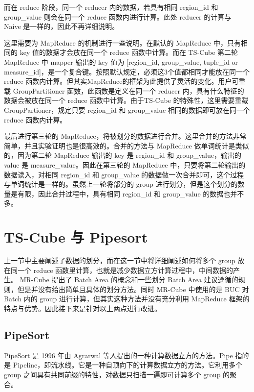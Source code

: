 而在 reduce 阶段，同一个 reducer 内的数据，若具有相同 region\_id 和 group\_value 则会在同一个 reduce 函数内进行计算。此处 reducer 的计算与 Naive 是一样的，因此不再详细说明。


这里需要为 MapReduce 的机制进行一些说明。在默认的 MapReduce 中，只有相同的 key 值的数据才会放在同一个 reduce 函数中计算。而在 TS-Cube 第二轮 MapReduce 中 mapper 输出的 key 值为 [region\_id, group\_value, tuple\_id or measure\_id]，是一个复合键。按照默认规定，必须这3个值都相同才能放在同一个 reduce 函数内计算。但其实MapReduce的框架为此提供了灵活的变化。用户可重载 GroupPartitioner 函数，此函数是定义在同一个 reducer 内，具有什么特征的数据会被放在同一个 reduce 函数中计算。由于TS-Cube 的特殊性，这里需要重载 GroupPartioner，规定只要 region\_id 和 group\_value 相同的数据即可放在同一个 reduce 函数内计算。

最后进行第三轮的 MapReduce，将被划分的数据进行合并。这里合并的方法非常简单，并且实验证明也是很高效的。合并的方法与 MapReduce 做单词统计是类似的，因为第二轮 MapReduce 输出的 key 是 region\_id 和 group\_value，输出的 value 是 measure\_value。因此在第三轮的 MapReduce 中，只要将第二轮输出的数据读入，对相同 region\_id 和 group\_value 的数据做一次合并即可，这个过程与单词统计是一样的。虽然上一轮将部分的 group 进行划分，但是这个划分的数量是有限，因此合并过程中，具有相同 region\_id 和 group\_value 的数据也并不多。


\section{TS-Cube 与 Pipesort}

上一节中主要阐述了数据的划分，而在这一节中将详细阐述如何将多个 group 放在同一个 reduce 函数里计算，也就是减少数据立方计算过程中，中间数据的产生。 MR-Cube 提出了 Batch Area 的概念和一些划分 Batch Area 建议遵循的规则，但是并没有给出简单且具体的划分方法。同时 MR-Cube 中使用的是 BUC 对Batch 内的 group 进行计算，但其实这种方法并没有充分利用 MapReduce 框架的特点与优势。因此接下来是针对以上两点进行改进。


\subsection{PipeSort}

PipeSort\cite{agarwal1996computation} 是 1996 年由 Agrarwal 等人提出的一种计算数据立方的方法。Pipe 指的是 Pipeline，即流水线。它是一种自顶向下的计算数据立方的方法。它利用多个 group 之间具有共同前缀的特性，对数据只扫描一遍即可计算多个 group 的聚合。

